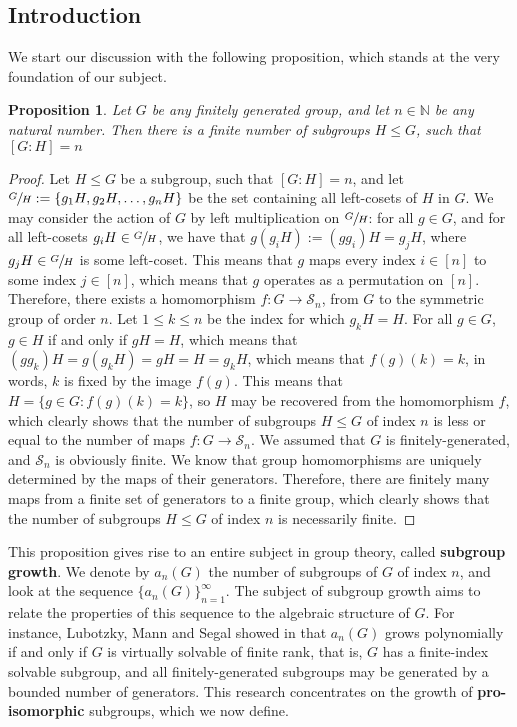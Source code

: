 \documentclass[12pt]{article}
\newtheorem{proposition}[theorem]{Proposition}
\begin{document}
\subsection{Introduction}
We start our discussion with the following proposition, which stands at the very foundation of our subject.
\begin{proposition} \label{prop:finite.number.subgroups}
Let $G$ be any finitely generated group, and let $n\in\mathbb{N}$ be any natural number. Then there is a finite number of subgroups $H\leq G$, such that $[G:H]=n$
\end{proposition}
\begin{proof}
Let $H\leq G$ be a subgroup, such that $[G:H]=n$, and let $\sfrac{G}{H}:=\{g_1H,g_2H,\dots,g_nH\}$ be the set containing all left-cosets of $H$ in $G$. We may consider the action of $G$ by left multiplication on $\sfrac{G}{H}$: for all $g\in G$, and for all left-cosets $g_iH\in\sfrac{G}{H}$, we have that $g(g_iH):=(gg_i)H=g_jH$, where $g_jH\in\sfrac{G}{H}$ is some left-coset. This means that $g$ maps every index $i\in[n]$ to some index $j\in[n]$, which means that $g$ operates as a permutation on $[n]$. Therefore, there exists a homomorphism $f:G\rightarrow\mathcal{S}_n$, from $G$ to the symmetric group of order $n$. Let $1\leq k\leq n$ be the index for which $g_kH=H$. For all $g\in G$, $g\in H$ if and only if $gH=H$, which means that $(gg_k)H=g(g_kH)=gH=H=g_kH$, which means that $f(g)(k)=k$, in words, $k$ is fixed by the image $f(g)$. This means that $H=\{g\in G : f(g)(k)=k\}$, so $H$ may be recovered from the homomorphism $f$, which clearly shows that the number of subgroups $H\leq G$ of index $n$ is less or equal to the number of maps $f : G
\rightarrow\mathcal{S}_n$. We assumed that $G$ is finitely-generated, and $\mathcal{S}_n$ is obviously finite. We know that group homomorphisms are uniquely determined by the maps of their generators. Therefore, there are finitely many maps from a finite set of generators to a finite group, which clearly shows that the number of subgroups $H\leq G$ of index $n$ is necessarily finite.
\end{proof}
This proposition gives rise to an entire subject in group theory, called \textbf{subgroup growth}. We denote by $a_n(G)$ the number of subgroups of $G$ of index $n$, and look at the sequence $\{a_n(G)\}_{n=1}^{\infty}$. The subject of subgroup growth aims to relate the properties of this sequence to the algebraic structure of $G$. For instance, Lubotzky, Mann and Segal showed in \cite{LubotzkyMannSegal} that $a_n(G)$ grows polynomially if and only if $G$ is virtually solvable of finite rank, that is, $G$ has a finite-index solvable subgroup, and all finitely-generated subgroups may be generated by a bounded number of generators. This research concentrates on the growth of \textbf{pro-isomorphic} subgroups, which we now define.
\end{document}

